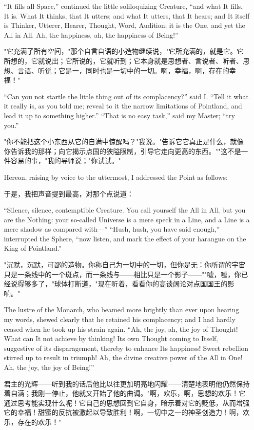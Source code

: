\documentclass[12pt,UTF8]{ctexbook}
\begin{document}
``It fills all Space,'' continued the little soliloquizing Creature, ``and what It fills, It is. What It thinks, that It utters; and what It utters, that It hears; and It itself is Thinker, Utterer, Hearer, Thought, Word, Audition; it is the One, and yet the All in All. Ah, the happiness, ah, the happiness of Being!''

"它充满了所有空间，"那个自言自语的小造物继续说，"它所充满的，就是它。它所想的，它就说出；它所说的，它就听到；它本身就是思想者、言说者、听者、思想、言语、听觉；它是一，同时也是一切中的一切。啊，幸福，啊，存在的幸福！"

``Can you not startle the little thing out of its complacency?'' said I. ``Tell it what it really is, as you told me; reveal to it the narrow limitations of Pointland, and lead it up to something higher.'' ``That is no easy task,'' said my Master; ``try you.''

"你不能把这个小东西从它的自满中惊醒吗？"我说。"告诉它它真正是什么，就像你告诉我的那样；向它揭示点国的狭隘限制，引导它走向更高的东西。""这不是一件容易的事，"我的导师说；"你试试。"

Hereon, raising by voice to the uttermost, I addressed the Point as follows:

于是，我把声音提到最高，对那个点说道：

``Silence, silence, contemptible Creature. You call yourself the All in All, but you are the Nothing: your so-called Universe is a mere speck in a Line, and a Line is a mere shadow as compared with---'' ``Hush, hush, you have said enough,'' interrupted the Sphere, ``now listen, and mark the effect of your harangue on the King of Pointland.''

"沉默，沉默，可鄙的造物。你称自己为一切中的一切，但你是无：你所谓的宇宙只是一条线中的一个斑点，而一条线与——相比只是一个影子——""嘘，嘘，你已经说得够多了，"球体打断道，"现在听着，看看你的高谈阔论对点国国王的影响。"

The lustre of the Monarch, who beamed more brightly than ever upon hearing my words, shewed clearly that he retained his complacency; and I had hardly ceased when he took up his strain again. ``Ah, the joy, ah, the joy of Thought! What can It not achieve by thinking! Its own Thought coming to Itself, suggestive of its disparagement, thereby to enhance Its happiness! Sweet rebellion stirred up to result in triumph! Ah, the divine creative power of the All in One! Ah, the joy, the joy of Being!''

君主的光辉——听到我的话后他比以往更加明亮地闪耀——清楚地表明他仍然保持着自满；我刚一停止，他就又开始了他的曲调。"啊，欢乐，啊，思想的欢乐！它通过思考能实现什么呢！它自己的思想回到它自身，暗示着对它的贬低，从而增强它的幸福！甜蜜的反抗被激起以导致胜利！啊，一切中之一的神圣创造力！啊，欢乐，存在的欢乐！"
\end{document}
